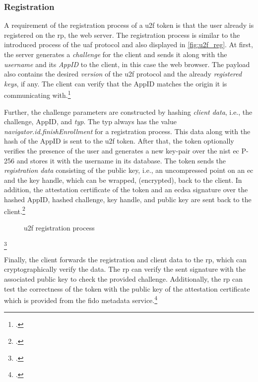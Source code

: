 \subsubsection{Registration}

A requirement of the registration process of a \gls{u2f} token is that the user already is registered on the \gls{rp}, the web server. The registration process is similar to the introduced process of the \gls{uaf} protocol and also displayed in \autoref{fig:u2f_reg}. At first, the server generates a \textit{challenge} for the client and sends it along with the \textit{username} and its \textit{AppID} to the client, in this case the web browser. The payload also contains the desired \textit{version} of the \gls{u2f} protocol and the already \textit{registered keys}, if any. The client can verify that the AppID matches the origin it is communicating with.\footcites[See][4--5]{u2f-js-api}[See][431]{10.1007/978-3-662-54970-4_25}

Further, the challenge parameters are constructed by hashing \textit{client data}, i.e., the challenge, AppID, and \textit{typ}. The typ always has the value \textit{navigator.id.finishEnrollment} for a registration process. This data along with the hash of the AppID is sent to the \gls{u2f} token. After that, the token optionally verifies the presence of the user and generates a new key-pair over the \gls{nist} \gls{ec} P-256 and stores it with the username in its database. The token sends the \textit{registration data} consisting of the public key, i.e., an uncompressed point on an \gls{ec} and the key handle, which can be wrapped, (encrypted), back to the client. In addition, the attestation certificate of the token and an \gls{ecdsa} signature over the hashed AppID, hashed challenge, key handle, and public key are sent back to the client.\footcites[See][4--5]{u2f-raw-message}[See][70]{10.1007/978-3-319-75650-9_5}

\begin{figure}[hbt]
	\centering
	
	\caption[\gls{u2f} registration process]{\gls{u2f} registration process\footnotemark}
	\label{fig:u2f_reg}
\end{figure}
\footcitetexts[Source: diagram by author, based on][69]{10.1007/978-3-319-75650-9_5}[][428]{10.1007/978-3-662-54970-4_25}

Finally, the client forwards the registration and client data to the \gls{rp}, which can cryptographically verify the data. The \gls{rp} can verify the sent signature with the associated public key to check the provided challenge. Additionally, the \gls{rp} can test the correctness of the token with the public key of the attestation certificate which is provided from the \gls{fido} metadata service.\footcites[See][3]{7860546}

